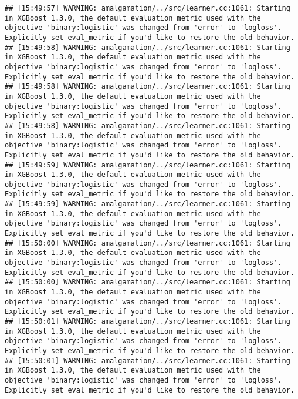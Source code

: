 \documentclass[
]{book}
\begin{document}
\begin{verbatim}
## [15:49:57] WARNING: amalgamation/../src/learner.cc:1061: Starting in XGBoost 1.3.0, the default evaluation metric used with the objective 'binary:logistic' was changed from 'error' to 'logloss'. Explicitly set eval_metric if you'd like to restore the old behavior.
## [15:49:58] WARNING: amalgamation/../src/learner.cc:1061: Starting in XGBoost 1.3.0, the default evaluation metric used with the objective 'binary:logistic' was changed from 'error' to 'logloss'. Explicitly set eval_metric if you'd like to restore the old behavior.
## [15:49:58] WARNING: amalgamation/../src/learner.cc:1061: Starting in XGBoost 1.3.0, the default evaluation metric used with the objective 'binary:logistic' was changed from 'error' to 'logloss'. Explicitly set eval_metric if you'd like to restore the old behavior.
## [15:49:58] WARNING: amalgamation/../src/learner.cc:1061: Starting in XGBoost 1.3.0, the default evaluation metric used with the objective 'binary:logistic' was changed from 'error' to 'logloss'. Explicitly set eval_metric if you'd like to restore the old behavior.
## [15:49:59] WARNING: amalgamation/../src/learner.cc:1061: Starting in XGBoost 1.3.0, the default evaluation metric used with the objective 'binary:logistic' was changed from 'error' to 'logloss'. Explicitly set eval_metric if you'd like to restore the old behavior.
## [15:49:59] WARNING: amalgamation/../src/learner.cc:1061: Starting in XGBoost 1.3.0, the default evaluation metric used with the objective 'binary:logistic' was changed from 'error' to 'logloss'. Explicitly set eval_metric if you'd like to restore the old behavior.
## [15:50:00] WARNING: amalgamation/../src/learner.cc:1061: Starting in XGBoost 1.3.0, the default evaluation metric used with the objective 'binary:logistic' was changed from 'error' to 'logloss'. Explicitly set eval_metric if you'd like to restore the old behavior.
## [15:50:00] WARNING: amalgamation/../src/learner.cc:1061: Starting in XGBoost 1.3.0, the default evaluation metric used with the objective 'binary:logistic' was changed from 'error' to 'logloss'. Explicitly set eval_metric if you'd like to restore the old behavior.
## [15:50:01] WARNING: amalgamation/../src/learner.cc:1061: Starting in XGBoost 1.3.0, the default evaluation metric used with the objective 'binary:logistic' was changed from 'error' to 'logloss'. Explicitly set eval_metric if you'd like to restore the old behavior.
## [15:50:01] WARNING: amalgamation/../src/learner.cc:1061: Starting in XGBoost 1.3.0, the default evaluation metric used with the objective 'binary:logistic' was changed from 'error' to 'logloss'. Explicitly set eval_metric if you'd like to restore the old behavior.

\end{verbatim}
\end{document}
